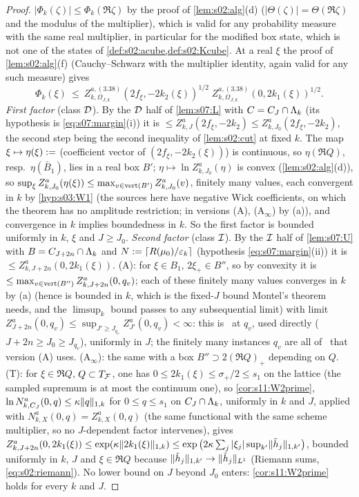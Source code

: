 \begin{proof}
$|\Phi_k(\zeta)|\le\Phi_k(\Re\zeta)$ by the proof of \cref{lem:s02:alg}(d) ($|\Theta(\zeta)|=\Theta(\Re\zeta)$ and the modulus of the multiplier), which is valid for any probability measure with the same real multiplier, in particular for the modified box state, which is not one of the states of \cref{def:s02:acube,def:s02:Kcube}. At a real $\xi$ the proof of \cref{lem:s02:alg}(f) (Cauchy--Schwarz with the multiplier identity, again valid for any such measure) gives
\begin{equation}\label{eq:s08:split}
\Phi_k(\xi)\ \le\ Z^{a,(3.38)}_{k,\Omega_{J,k}}(2f_\xi,-2k_2(\xi))^{1/2}\;Z^{a,(3.38)}_{k,\Omega_{J,k}}(0,2k_1(\xi))^{1/2}.
\end{equation}
\emph{First factor} (class $\mathcal D$). By the $\mathcal D$ half of \cref{lem:s07:L} with $C=C_J\cap\Lambda_k$ (its hypothesis is \eqref{eq:s07:margin}(i)) it is $\le Z^a_{k,J}(2f_\xi,-2k_2)\le Z^a_{k,J_0}(2f_\xi,-2k_2)$, the second step being the second inequality of \cref{lem:s02:cut} at fixed $k$. The map $\xi\mapsto\eta(\xi):=$ (coefficient vector of $(2f_\xi,-2k_2(\xi))$) is continuous, so $\eta(\Re Q)$, resp.\ $\eta(\bar B_1)$, lies in a real box $B'$; $\eta\mapsto\ln Z^a_{k,J_0}(\eta)$ is convex (\cref{lem:s02:alg}(d)), so $\sup_\xi Z^a_{k,J_0}(\eta(\xi))\le\max_{v\in\operatorname{vert}(B')}Z^a_{k,J_0}(v)$, finitely many values, each convergent in $k$ by \cref{hyp:s03:W1} (the sources here have negative Wick coefficients, on which the theorem has no amplitude restriction; in versions (A), (A$_\infty$) by \Wtwo(a)), and convergence in $k$ implies boundedness in $k$. So the first factor is bounded uniformly in $k$, $\xi$ and $J\ge J_0$.
\emph{Second factor} (class $\mathcal I$). By the $\mathcal I$ half of \cref{lem:s07:U} with $B=C_{J+2n}\cap\Lambda_k$ and $N:=\lceil R(\mu_0)/\varepsilon_k\rceil$ (hypothesis \eqref{eq:s07:margin}(ii)) it is $\le Z^a_{k,J+2n}(0,2k_1(\xi))$. (A): for $\xi\in B_1$, $2\xi_+\in B''$, so by convexity it is $\le\max_{v\in\operatorname{vert}(B'')}Z^a_{k,J+2n}(0,q_v)$; each of these finitely many values converges in $k$ by \Wtwo(a) (hence is bounded in $k$, which is the fixed-$J$ bound Montel's theorem needs, and the $\limsup_k$ bound passes to any subsequential limit) with limit $Z^a_{J+2n}(0,q_v)\le\sup_{J'\ge J_{q_v}}Z^a_{J'}(0,q_v)<\infty$: this is \Wtwo\ at $q_v$, used directly ($J+2n\ge J_0\ge J_{q_v}$), uniformly in $J$; the finitely many instances $q_v$ are all of \Wtwo\ that version (A) uses. (A$_\infty$): the same with a box $B''\supset2(\Re Q)_+$ depending on $Q$. (T): for $\xi\in\Re Q$, $Q\subset T_{\mathcal F}$, one has $0\le2k_1(\xi)\le\sigma_+/2\le s_1$ on the lattice (the sampled supremum is at most the continuum one), so \cref{cor:s11:W2prime}, $\ln N^a_{k,C_J}(0,q)\le\kappa\lVert q\rVert_{1,k}$ for $0\le q\le s_1$ on $C_J\cap\Lambda_k$, uniformly in $k$ and $J$, applied with $N^a_{k,X}(0,q)=Z^a_{k,X}(0,q)$ (the same functional with the same scheme multiplier, so no $J$-dependent factor intervenes), gives $Z^a_{k,J+2n}(0,2k_1(\xi))\le\exp(\kappa\lVert 2k_1(\xi)\rVert_{1,k})\le\exp\big(2\kappa\sum_j|\xi_j|\sup_{k'}\lVert \tilde h_j\rVert_{1,k'}\big)$, bounded uniformly in $k$, $J$ and $\xi\in\Re Q$ because $\lVert \tilde h_j\rVert_{1,k'}\to\lVert \tilde h_j\rVert_{L^1}$ (Riemann sums, \eqref{eq:s02:riemann}). No lower bound on $J$ beyond $J_0$ enters: \cref{cor:s11:W2prime} holds for every $k$ and $J$.

\end{proof}

